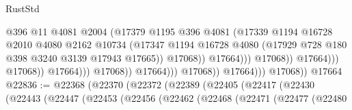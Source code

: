 \begin{lexlean}{RustStd}
\begin{coremodule}
                                                      @396
                                                      @11
                                                      @4081
                                                      @2004
                                                      (@17379
                                                        @1195
                                                        @396
                                                        @4081
                                                        (@17339
                                                          @1194
                                                          @16728
                                                          @2010
                                                          @4080
                                                          @2162
                                                          @10734
                                                          (@17347
                                                            @1194
                                                            @16728
                                                            @4080
                                                            (@17929
                                                              @728
                                                              @180
                                                              @398
                                                              @3240
                                                              @3139
                                                              @17943
                                                              @17665))
                                                          @17068))
                                                      @17664)))
                                                @17068))
                                            @17664)))
                                      @17068))
                                  @17664)))
                            @17068))
                        @17664)))
                  @17068))
              @17664)))
        @17068))
    @17664
@22836 := @22368
    (@22370
      (@22372
        (@22389
          (@22405
            (@22417
              (@22430
                (@22443
                  (@22447
                    (@22453
                      (@22456
                        (@22462
                          (@22468
                            (@22471
                              (@22477
                                (@22480

\end{coremodule}
\end{lexlean}
